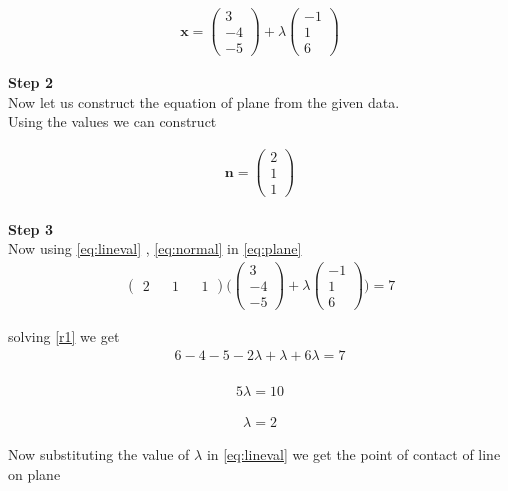 \documentclass[10pt,a4paper,twocolumn]{article}
\newcommand{\myvec}[1]{\ensuremath{\begin{pmatrix}#1\end{pmatrix}}}
\numberwithin{equation}{section}
\begin{document}
\begin{align}
\textbf{x}=\myvec{3 \\-4 \\-5}+\lambda 
\myvec{-1 \\1 \\6}\label{eq:lineval}
\end{align}

\textbf{Step 2}\\
Now let us construct the equation of plane from the given data.\\
Using the values we can construct 

\begin{align}
\textbf{n}=\myvec{ 2\\ 1\\1}\label{eq:normal}
\end{align}\\

\textbf{Step 3}\\
Now using \ref{eq:lineval} , \ref{eq:normal}   in \ref{eq:plane}\\

\begin{align}
\myvec{ 2 && 1 && 1} \Bigg( \myvec{3 \\-4 \\-5}+\lambda\myvec{-1 \\1 \\6} \Bigg)=7\label{eq4}
\end{align}

solving \ref{r1} we get \\
\begin{align}  
6 -4 -5-2\lambda+ \lambda+ 6 \lambda=7 
\end{align}
\\ 
\begin{align} 
5 \lambda=10 
\end{align}

\begin{align}
\lambda=2 \label{eq5} 
\end{align}

Now substituting the value of $\lambda$ in \ref{eq:lineval} we get the point of contact of line on plane
\end{document}
